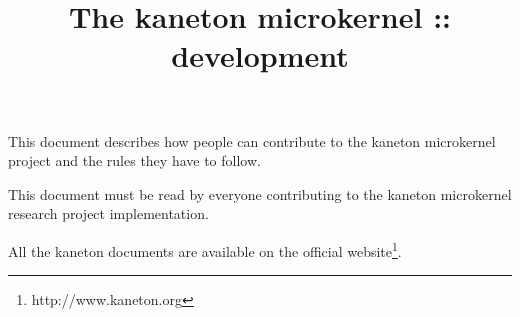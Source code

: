 %
%
%
%
%
%

%
%

%
%

\def\path{../..}

%
%



%
%


%
%

\title{The kaneton microkernel :: development \\
       \version
       \logo}

%
%



%
%

\maketitle

%
%

This document describes how people can contribute to the kaneton microkernel
project and the rules they have to follow.

\-

This document must be read by everyone contributing to the kaneton
microkernel research project implementation.

\-

All the kaneton documents are available on
  the official website\footnote{http://www.kaneton.org}.

%
%

\tableofcontents

%
%

\indentation{}

%
%











